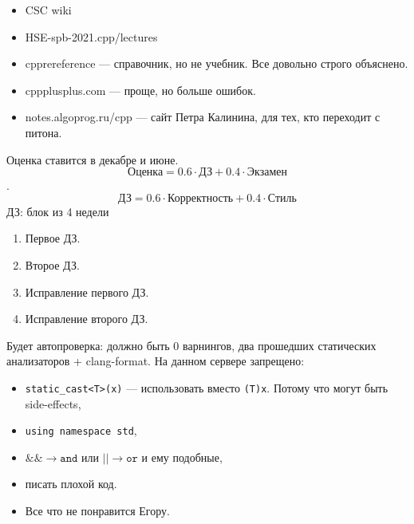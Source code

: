 \begin{itemize}
    \item CSC wiki
    \item HSE-spb-2021.cpp/lectures
    \item cpprereference --- справочник, но не учебник. Все довольно строго объяснено.
    \item cppplusplus.com --- проще, но больше ошибок.
    \item notes.algoprog.ru/cpp --- сайт Петра Калинина, для тех, кто переходит с питона. 
\end{itemize}
Оценка ставится в декабре и июне. \\
$$\text{Оценка} = 0.6\cdot\text{ДЗ} + 0.4\cdot\text{Экзамен}$$. $$\text{ДЗ} = 0.6\cdot\text{Корректность} + 0.4\cdot\text{Стиль}$$
ДЗ: блок из 4 недели
\begin{enumerate}
    \item Первое ДЗ.
    \item Второе ДЗ.
    \item Исправление первого ДЗ.
    \item Исправление второго ДЗ.
\end{enumerate}

Будет автопроверка: должно быть 0 варнингов, два прошедших статических анализаторов + clang-format. На данном сервере запрещено:
\begin{itemize}
    \item \texttt{static\_cast<T>(x)} --- использовать вместо \texttt{(T)x}. Потому что могут быть side-effects,
    \item \texttt{using namespace std},
    \item $\&\& \to \texttt{and}$ или $|| \to \texttt{or}$ и ему подобные,
    \item писать плохой код.
    \item Все что не понравится Егору.
\end{itemize}
